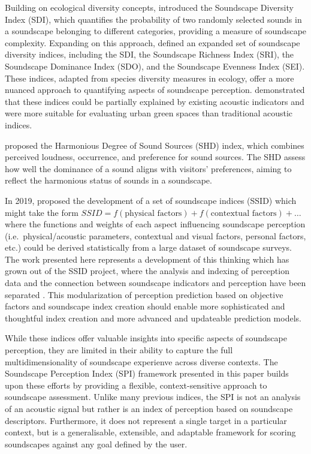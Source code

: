 \documentclass[
  authoryear,
  3p]{elsarticle}
\begin{document}
Building on ecological diversity concepts, \citet{Liu2014Effects}
introduced the Soundscape Diversity Index (SDI), which quantifies the
probability of two randomly selected sounds in a soundscape belonging to
different categories, providing a measure of soundscape complexity.
Expanding on this approach, \citet{Xiang2023Soundscape} defined an
expanded set of soundscape diversity indices, including the SDI, the
Soundscape Richness Index (SRI), the Soundscape Dominance Index (SDO),
and the Soundscape Evenness Index (SEI). These indices, adapted from
species diversity measures in ecology, offer a more nuanced approach to
quantifying aspects of soundscape perception.
\citet{Xiang2023Soundscape} demonstrated that these indices could be
partially explained by existing acoustic indicators and were more
suitable for evaluating urban green spaces than traditional acoustic
indices.

\citet{Guo2023Harmonious} proposed the Harmonious Degree of Sound
Sources (SHD) index, which combines perceived loudness, occurrence, and
preference for sound sources. The SHD assess how well the dominance of a
sound aligns with visitors' preferences, aiming to reflect the
harmonious status of sounds in a soundscape.

In 2019, \citet{Kang2019Towards} proposed the development of a set of
soundscape indices (SSID) which might take the form
\(SSID = f(\text{physical factors}) + f(\text{contextual factors}) + \ldots\)
where the functions and weights of each aspect influencing soundscape
perception (i.e.~physical/acoustic parameters, contextual and visual
factors, personal factors, etc.) could be derived statistically from a
large dataset of soundscape surveys. The work presented here represents
a development of this thinking which has grown out of the SSID project,
where the analysis and indexing of perception data and the connection
between soundscape indicators and perception have been separated
\citep{Mitchell2023conceptual}. This modularization of perception
prediction based on objective factors and soundscape index creation
should enable more sophisticated and thoughtful index creation and more
advanced and updateable prediction models.

While these indices offer valuable insights into specific aspects of
soundscape perception, they are limited in their ability to capture the
full multidimensionality of soundscape experienve across diverse
contexts. The Soundscape Perception Index (SPI) framework presented in
this paper builds upon these efforts by providing a flexible,
context-sensitive approach to soundscape assessment. Unlike many
previous indices, the SPI is not an analysis of an acoustic signal but
rather is an index of perception based on soundscape descriptors.
Furthermore, it does not represent a single target in a particular
context, but is a generalisable, extensible, and adaptable framework for
scoring soundscapes against any goal defined by the user.
\end{document}

